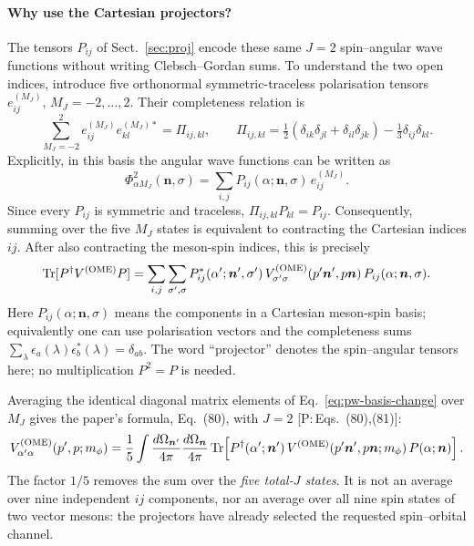 \documentclass[11pt,a4paper]{article}
\newcommand{\tagP}[1]{\textcolor{blue!65!black}{\textsf{\small[P:\,#1]}}}
\newcommand{\VOME}{V^{\rm (OME)}}
\newcommand{\vn}{\bm n}
\begin{document}
\paragraph{Why use the Cartesian projectors?}
The tensors $P_{ij}$ of Sect.~\ref{sec:proj} encode these same $J=2$ spin--angular wave functions without writing Clebsch--Gordan sums. To understand the two open indices, introduce five orthonormal symmetric-traceless polarisation tensors $e_{ij}^{(M_J)}$, $M_J=-2,\ldots,2$. Their completeness relation is
\begin{equation}
\sum_{M_J=-2}^{2}e_{ij}^{(M_J)}e_{kl}^{(M_J)*}
=\Pi_{ij,kl},\qquad
\Pi_{ij,kl}=\tfrac12(\delta_{ik}\delta_{jl}+\delta_{il}\delta_{jk})
-\tfrac13\delta_{ij}\delta_{kl}.
\label{eq:pw-STF}
\end{equation}
Explicitly, in this basis the angular wave functions can be written as
\[
\Phi_{\alpha M_J}^{2}(\vn,\sigma)
=\sum_{i,j}P_{ij}(\alpha;\vn,\sigma)\,e_{ij}^{(M_J)}.
\]
Since every $P_{ij}$ is symmetric and traceless, $\Pi_{ij,kl}P_{kl}=P_{ij}$. Consequently, summing over the five $M_J$ states is equivalent to contracting the Cartesian indices $ij$. After also contracting the meson-spin indices, this is precisely
\begin{equation}
{\rm Tr}[P^\dagger\VOME P]
=\sum_{i,j}\sum_{\sigma',\sigma}
P_{ij}^{*}(\alpha';\vn',\sigma')\,
\VOME_{\sigma'\sigma}(p'\vn',p\vn)\,
P_{ij}(\alpha;\vn,\sigma).
\label{eq:pw-trace}
\end{equation}
Here $P_{ij}(\alpha;\vn,\sigma)$ means the components in a Cartesian meson-spin basis; equivalently one can use polarisation vectors and the completeness sums
$\sum_\lambda\epsilon_a(\lambda)\epsilon_b^*(\lambda)=\delta_{ab}$.
The word ``projector'' denotes the spin--angular tensors here; no multiplication $P^2=P$ is needed.

Averaging the identical diagonal matrix elements of Eq.~\eqref{eq:pw-basis-change} over $M_J$ gives the paper's formula, Eq.~(80), with $J=2$ \tagP{Eqs.~(80),(81)}:
\begin{equation}
\VOME_{\alpha'\alpha}(p',p;m_\phi)
=\frac15\int\frac{d\Omega_{\vn'}}{4\pi}
\frac{d\Omega_{\vn}}{4\pi}\,
{\rm Tr}\!\left[P^\dagger(\alpha';\vn')\,
\VOME(p'\vn',p\vn;m_\phi)\,P(\alpha;\vn)\right].
\label{eq:pw-projection}
\end{equation}
The factor $1/5$ removes the sum over the \emph{five total-$J$ states}. It is not an average over nine independent $ij$ components, nor an average over all nine spin states of two vector mesons: the projectors have already selected the requested spin--orbital channel.
\end{document}
